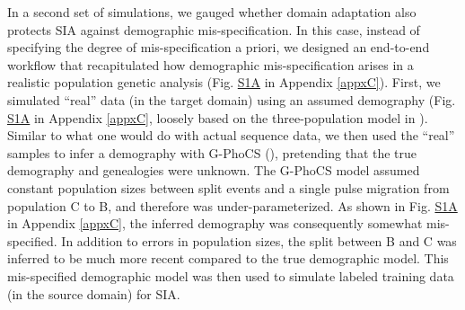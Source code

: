 In a second set of simulations, we gauged whether domain adaptation also protects \ac{SIA} against demographic mis-specification. In this case, instead of specifying the degree of mis-specification a priori, we designed an end-to-end workflow that recapitulated how demographic mis-specification arises in a realistic population genetic analysis (Fig. \href{https://journals.plos.org/plosgenetics/article?id=10.1371/journal.pgen.1011032#sec018}{S1A} in Appendix \ref{appxC}). First, we simulated “real” data (in the target domain) using an assumed demography (Fig. \href{https://journals.plos.org/plosgenetics/article?id=10.1371/journal.pgen.1011032#sec018}{S1A} in Appendix \ref{appxC}, loosely based on the three-population model in \cite{campagna_selective_2022}). Similar to what one would do with actual sequence data, we then used the “real” samples to infer a demography with G-PhoCS (\cite{gronau_bayesian_2011}), pretending that the true demography and genealogies were unknown. The G-PhoCS model assumed constant population sizes between split events and a single pulse migration from population C to B, and therefore was under-parameterized. As shown in Fig. \href{https://journals.plos.org/plosgenetics/article?id=10.1371/journal.pgen.1011032#sec018}{S1A} in Appendix \ref{appxC}, the inferred demography was consequently somewhat mis-specified. In addition to errors in population sizes, the split between B and C was inferred to be much more recent compared to the true demographic model. This mis-specified demographic model was then used to simulate labeled training data (in the source domain) for \ac{SIA}.

